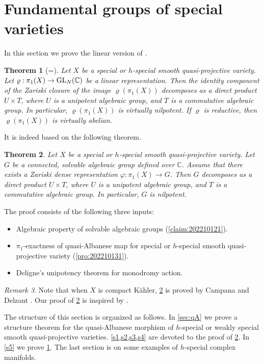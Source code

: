 \documentclass[11pt,english]{smfart}
\theoremstyle{plain}
\newtheorem{thm}{Theorem}[section]
\theoremstyle{definition}
\theoremstyle{remark}
\newtheorem{rem}[thm]{Remark}
\numberwithin{equation}{subsection}
\theoremstyle{plain}
\newcommand{\bC}{\mathbb{C}}
\begin{document}
\section{Fundamental groups of special varieties}\label{sec:VN}
In this section we  prove  the linear version of . 
\begin{thm}[=]\label{thm:VN}
	Let $X$ be a   special  or $h$-special smooth quasi-projective variety.   Let  $\varrho:\pi_1(X)\to {\rm GL}_N(\bC)$ be a  linear representation.   
	Then the identity component of the Zariski closure of the image $\varrho(\pi_1(X))$  decomposes as a direct product $U\times T$, where $U$ is a  unipotent algebraic group, and $T$ is a commutative algebraic group. 
	In particular,  $\varrho(\pi_1(X)) $ is {virtually nilpotent}.  If $\varrho$ is reductive,  then  $\varrho(\pi_1(X)) $ is  {virtually abelian}.
\end{thm} 
It is indeed based on the following  theorem. 
\begin{thm}\label{thm:202210123}
Let $X$ be a special or $h$-special smooth quasi-projective variety.
Let $G$ be a connected, solvable algebraic group defined over $\mathbb C$.
Assume that there exists a Zariski dense representation $\varphi:\pi_1(X)\to G$.
Then $G$ decomposes as a direct product $U\times T$, where $U$ is a  unipotent algebraic group, and $T$ is a commutative algebraic group. 
In particular, $G$ is nilpotent.
\end{thm} 
The proof consists of the following three inputs: 
\begin{itemize} 
\item
Algebraic property of solvable algebraic groups (\cref{claim:202210121}).
\item
$\pi_1$-exactness of quasi-Albanese map for  special or $h$-special smooth quasi-projective variety (\cref{pro:202210131}).
\item
Deligne's unipotency theorem for monodromy action.
\end{itemize}
\begin{rem}
	Note that when $X$ is compact K\"ahler,  \cref{thm:202210123} is proved by Campana  \cite{Cam01} and Delzant \cite{Del10}.  Our proof of \cref{thm:202210123} is inspired by \cite[\S 4]{Cam01}.
\end{rem}

The structure of this section is organized as follows. 
In \cref{sec:qA} we prove a structure theorem for the quasi-Albanese morphism of  $h$-special or weakly special smooth quasi-projective varieties. \cref{s1,s2,s3,s4} are devoted to the proof of \cref{thm:202210123}. In \cref{s5} we prove \cref{thm:VN}. The last section is  on some examples of $h$-special complex manifolds.
\end{document}
